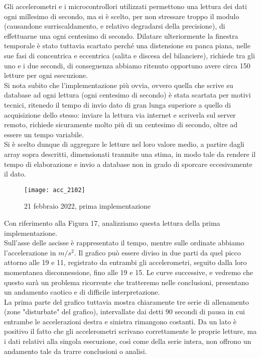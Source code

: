 \documentclass[fleqn,10pt]{SelfArx} %
\begin{document}
Gli accelerometri e i microcontrollori utilizzati permettono una lettura dei dati ogni millesimo di secondo, ma 
si è scelto, per non stressare troppo il modulo (causandone surriscaldamento, e relativo degradarsi della 
precisione), di effettuarne una ogni centesimo di secondo. Dilatare ulteriormente la finestra temporale è stato 
tuttavia scartato perché una distensione su panca piana, nelle sue fasi di concentrica e eccentrica (salita e 
discesa del bilanciere), richiede tra gli uno e i due secondi, di conseguenza abbiamo ritenuto opportuno 
avere circa 150 letture per ogni esecuzione.\\
Si nota subito che l'implementazione più ovvia, ovvero quella che scrive su database ad ogni lettura (ogni 
centesimo di secondo) è stata scartata per motivi tecnici, ritenedo il tempo di invio dato di gran lunga superiore 
a quello di acquisizione dello stesso: inviare la lettura via internet e scriverla sul server remoto, richiede 
sicuramente molto più di un centesimo di secondo, oltre ad essere un tempo variabile.\\

Si è scelto dunque di aggregare le letture nel loro valore medio, a partire dagli array sopra descritti, 
dimensionati tranmite una stima, in modo tale da rendere il tempo di elaborazione e invio a database non in grado 
di sporcare eccesivamente il dato.

\begin{figure}[htb]\centering
	\texttt{[image: acc\_2102]}
	\caption{21 febbraio 2022, prima implementazione}
	\label{fig:accelerazione 2102}
\end{figure}

Con riferimento alla Figura 17, analizziamo questa lettura della prima implementazione.\\
Sull'asse delle ascisse è rappresentato il tempo, mentre sulle ordinate abbiamo l'accelerazione in $ m/s^2 $.
Il grafico può essere diviso in due parti da quel picco attorno alle 19 e 11, registrato da entrambi gli accelerometri,
seguito dalla loro momentanea disconnessione, fino alle 19 e 15. Le curve successive, e vedremo che questo sarà un 
problema ricorrente che tratteremo nelle conclusioni, presentano un andamento caotico e di difficile interpretazione.\\
La prima parte del grafico tuttavia mostra chiaramente tre serie di allenamento (zone "disturbate" del grafico), 
intervallate dai detti 90 secondi di pausa in cui entrambe le accelerazioni destra e sinistra rimangono costanti.
Da un lato è positivo il fatto che gli accelerometri scrivano correttamente le proprie letture, ma i dati relativi alla 
singola esecuzione, così come della serie intera, non offrono un andamento tale da trarre conclusioni o analisi.
\end{document}
